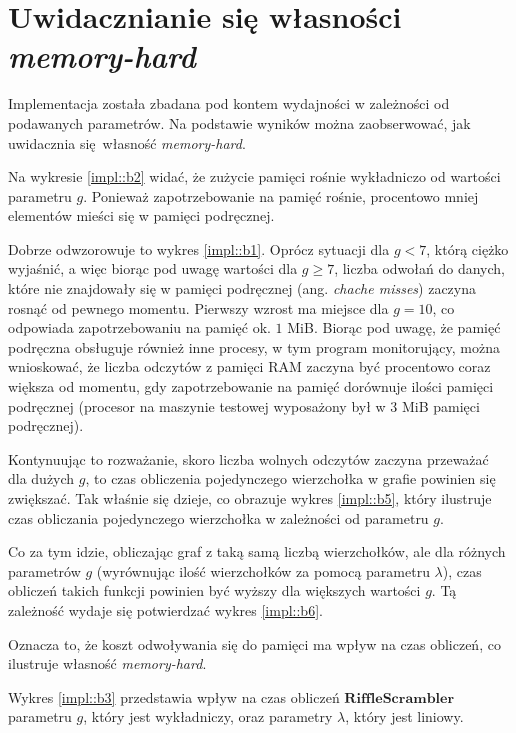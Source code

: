 \section{Uwidacznianie się własności \textit{memory-hard}}
Implementacja została zbadana pod kontem wydajności w zależności od podawanych parametrów.
Na podstawie wyników można zaobserwować, jak uwidacznia się własność \textit{memory-hard}.

Na wykresie \ref{impl::b2} widać, że zużycie pamięci rośnie wykładniczo od wartości parametru $g$.
Ponieważ zapotrzebowanie na pamięć rośnie, procentowo mniej elementów mieści się w pamięci podręcznej.

Dobrze odwzorowuje to wykres \ref{impl::b1}. Oprócz sytuacji dla $g < 7$, którą ciężko wyjaśnić, a więc biorąc pod uwagę wartości dla $g \geq 7$, liczba odwołań do danych, które nie znajdowały się w pamięci podręcznej (ang. \textit{chache misses}) zaczyna rosnąć od pewnego momentu.
Pierwszy wzrost ma miejsce dla $g = 10$, co odpowiada zapotrzebowaniu na pamięć ok. $1$ MiB. Biorąc pod uwagę, że pamięć podręczna obsługuje również inne procesy, w tym program monitorujący, można wnioskować, że liczba odczytów z pamięci RAM zaczyna być procentowo coraz większa od momentu, gdy zapotrzebowanie na pamięć dorównuje ilości pamięci podręcznej (procesor na maszynie testowej wyposażony był w $3$ MiB pamięci podręcznej).

Kontynuując to rozważanie, skoro liczba wolnych odczytów zaczyna przeważać dla dużych $g$, to czas obliczenia pojedynczego wierzchołka w grafie powinien się zwiększać. Tak właśnie się dzieje, co obrazuje wykres \ref{impl::b5}, który ilustruje czas obliczania pojedynczego wierzchołka w zależności od parametru $g$.

Co za tym idzie, obliczając graf z taką samą liczbą wierzchołków, ale dla różnych parametrów $g$ (wyrównując ilość wierzchołków za pomocą parametru $\lambda$), czas obliczeń takich funkcji powinien być wyższy dla większych wartości $g$. Tą zależność wydaje się potwierdzać wykres \ref{impl::b6}.

Oznacza to, że koszt odwoływania się do pamięci ma wpływ na czas obliczeń, co ilustruje własność \textit{memory-hard}.


Wykres \ref{impl::b3} przedstawia wpływ na czas obliczeń $\mathbf{RiffleScrambler}$ parametru $g$, który jest wykładniczy, oraz parametry $\lambda$, który jest liniowy.


